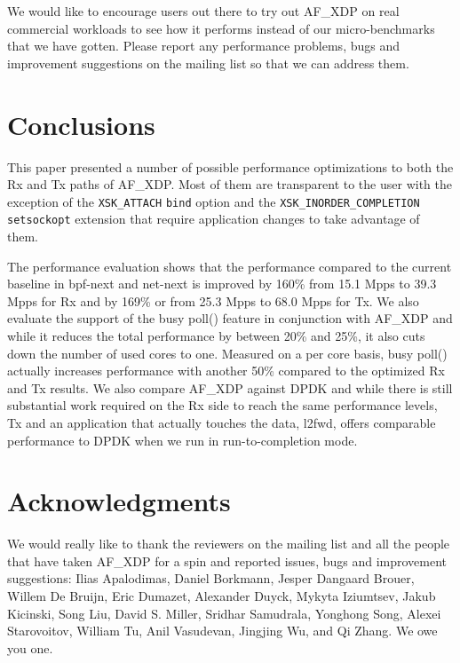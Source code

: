 \documentclass[9pt,numbers,reprint]{sigplanconf}
\begin{document}
We would like to encourage users out there to try out AF\_XDP on real
commercial workloads to see how it performs instead of our
micro-benchmarks that we have gotten. Please report any performance
problems, bugs and improvement suggestions on the mailing list so that
we can address them.


\section{Conclusions}
\label{sec:conclutions}

This paper presented a number of possible performance optimizations to
both the Rx and Tx paths of AF\_XDP. Most of them are transparent to
the user with the exception of the {\tt XSK\_ATTACH} {\tt bind} option
and the {\tt XSK\_INORDER\_COMPLETION} {\tt setsockopt} extension that
require application changes to take advantage of them.

The performance evaluation shows that the performance compared to the
current baseline in bpf-next and net-next is improved by 160\% from
15.1 Mpps to 39.3 Mpps for Rx and by 169\% or from 25.3 Mpps to 68.0
Mpps for Tx. We also evaluate the support of the busy poll() feature
in conjunction with AF\_XDP and while it reduces the total performance
by between 20\% and 25\%, it also cuts down the number of used cores
to one. Measured on a per core basis, busy poll() actually increases
performance with another 50\% compared to the optimized Rx and Tx
results. We also compare AF\_XDP against DPDK and while there is still
substantial work required on the Rx side to reach the same performance
levels, Tx and an application that actually touches the data, l2fwd,
offers comparable performance to DPDK when we run in run-to-completion
mode.


\section{Acknowledgments}
\label{sec:thanks}

We would really like to thank the reviewers on the mailing list and
all the people that have taken AF\_XDP for a spin and reported issues,
bugs and improvement suggestions: Ilias Apalodimas, Daniel Borkmann,
Jesper Dangaard Brouer, Willem De Bruijn, Eric Dumazet, Alexander
Duyck, Mykyta Iziumtsev, Jakub Kicinski, Song Liu, David S. Miller,
Sridhar Samudrala, Yonghong Song, Alexei Starovoitov, William Tu, Anil
Vasudevan, Jingjing Wu, and Qi Zhang. We owe you one.



\end{document}
